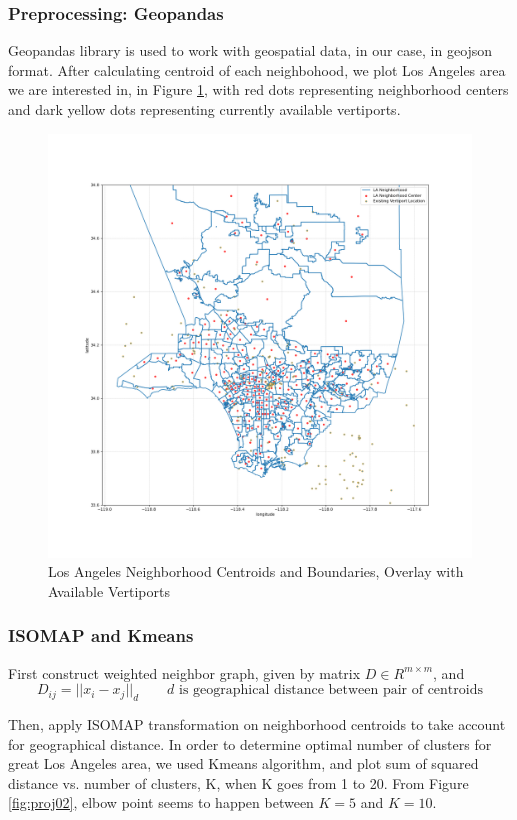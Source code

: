 \documentclass{article}
\begin{document}
\subsubsection{Preprocessing: Geopandas}
Geopandas library is used to work with geospatial data, in our case, in geojson format. After calculating centroid of each neighbohood, we plot Los Angeles area we are interested in, in Figure \ref{fig:proj01}, with red dots representing neighborhood centers and dark yellow dots representing currently available vertiports.



\begin{figure}[ht]
\centering
\includegraphics[width=\textwidth]{proj01.png}
\caption{Los Angeles Neighborhood Centroids and Boundaries, Overlay with Available Vertiports }
\label{fig:proj01}
\end{figure}

\subsubsection{ISOMAP and Kmeans}
First construct weighted neighbor graph, given by matrix $D\in R^{m\times m}$, and
\[
D_{ij} = ||x_i - x_j||_d \qquad d \text{ is geographical distance between pair of centroids}
\]

Then, apply ISOMAP transformation on neighborhood centroids to take account for geographical distance. In order to determine optimal number of clusters for great Los Angeles area, we used Kmeans algorithm, and plot sum of squared distance vs. number of clusters, K, when K goes from 1 to 20. From Figure \ref{fig:proj02}, elbow point seems to happen between $K=5$ and $K=10$.
\end{document}
